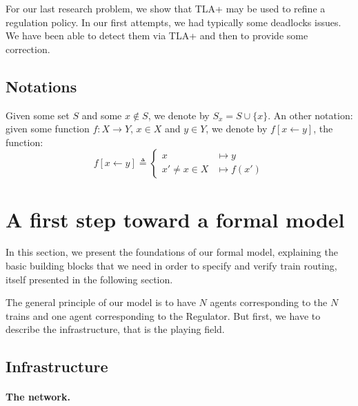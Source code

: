 \documentclass[runningheads]{llncs}
\begin{document}
For our last research problem, we show that TLA+ may be used to refine a regulation policy. In our first attempts, we had typically some deadlocks issues. We have been able to detect them via TLA+ and then to provide some correction. 




\subsection{Notations}

Given some set $S$ and some $x \not\in S$, we denote by $S_x = S \cup \{ x\}$.  An other notation: given some function $f: X \to Y$, $x \in X$ and $y \in Y$, we denote by $f[x \leftarrow y]$, the function:
 $$f[x \leftarrow y] \triangleq \left\{  \begin{array}{ll} x &\mapsto y\\
x' \neq x \in X &\mapsto f(x')
\end{array}\right.$$


\section{A first step toward a formal model}
\label{sec:informal-model}

In this section, we present the foundations of our formal model, explaining the basic building blocks that we need in order to specify and verify train routing, itself presented in the following section.

The general principle of our model is to have $N$ agents corresponding to the $N$ trains and one agent corresponding to the Regulator. But first, we have to describe the infrastructure, that is  the playing field. 

\subsection{Infrastructure}

\paragraph{The network.} 
\end{document}

